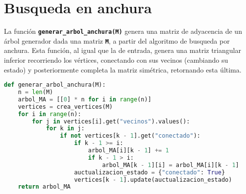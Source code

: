 \section{Busqueda en anchura}
La función \texttt{\textbf{generar\_arbol\_anchura(M)}} genera una matriz de adyacencia de un árbol generador dada una matriz \texttt{\textbf{M}}, a partir del algoritmo de busqueda por anchura.
Esta función, al igual que la de entrada, genera una matriz triangular inferior recorriendo los vértices, conectando con sus vecinos (cambiando su estado) y posteriormente completa la matriz simétrica, retornando esta última.
\begin{lstlisting}[language=python, caption=Función generar\_arbol\_anchura(M)]
def generar_arbol_anchura(M):
    n = len(M)
    arbol_MA = [[0] * n for i in range(n)]
    vertices = crea_vertices(M)
    for i in range(n):
        for j in vertices[i].get("vecinos").values():
            for k in j:
                if not vertices[k - 1].get("conectado"):
                    if k - 1 >= i:
                        arbol_MA[i][k - 1] += 1
                        if k - 1 > i:
                            arbol_MA[k - 1][i] = arbol_MA[i][k - 1]
                    auctualizacion_estado = {"conectado": True}
                    vertices[k - 1].update(auctualizacion_estado)
    return arbol_MA
\end{lstlisting}